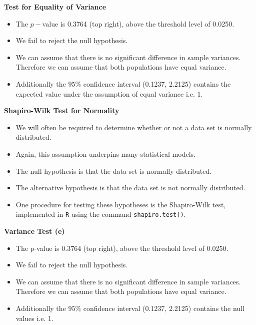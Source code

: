 \documentclass[]{report}
\begin{document}


\textbf{Test for Equality of Variance}
\begin{itemize}
	\item The $p-$value is 0.3764 (top right), above the threshold level of 0.0250.
	\item We fail to reject the null hypothesis.
	\item We can assume that there is no significant difference in sample variances. Therefore we can assume that both populations have equal variance.
	\item Additionally the $95\%$ confidence interval (0.1237, 2.2125) contains the expected value under the assumption of equal variance i.e. 1.
\end{itemize}






\textbf{Shapiro-Wilk Test for Normality}


\begin{itemize}
	\item We will often be required to determine whether or not a data set is normally distributed.
	\item Again, this assumption underpins many statistical models.
	\item The null hypothesis is that the data set is normally distributed.
	\item The alternative hypothesis is that the data set is not normally distributed.
	\item One procedure for testing these hypotheses is the Shapiro-Wilk test, implemented in \texttt{R} using the command \texttt{shapiro.test()}.
\end{itemize}





\textbf{Variance Test (e)}
\begin{itemize}
	\item The p-value is 0.3764 (top right), above the threshold level of 0.0250.
	\item We fail to reject the null hypothesis.
	\item We can assume that there is no significant difference in sample variances. Therefore we can assume that both populations have equal variance.
	\item Additionally the $95\%$ confidence interval (0.1237, 2.2125) contains the null values i.e. 1.
\end{itemize}
\end{document}
